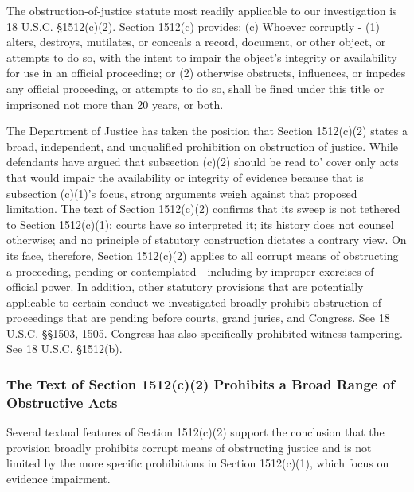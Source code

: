 The obstruction-of-justice statute most readily applicable to our investigation is 18 U.S.C.
\S 1512(c)(2). Section 1512(c) provides:
(c) Whoever corruptly -
(1) alters, destroys, mutilates, or conceals a record, document, or other object, or
attempts to do so, with the intent to impair the object’s integrity or availability for
use in an official proceeding; or
(2) otherwise obstructs, influences, or impedes any official proceeding, or attempts
to do so,
shall be fined under this title or imprisoned not more than 20 years, or both.

The Department of Justice has taken the position that Section 1512(c)(2) states a broad, independent, and unqualified prohibition on obstruction of justice.%
While defendants have argued that subsection (c)(2) should be read to’ cover only acts that would impair the availability or integrity of evidence because that is subsection (c)(1)’s focus, strong arguments weigh against that proposed limitation.
The text of Section 1512(c)(2) confirms that its sweep is not tethered to Section 1512(c)(1); courts have so interpreted it; its history does not counsel otherwise; and no principle of statutory construction dictates a contrary view.
On its face, therefore, Section 1512(c)(2) applies to all corrupt means of obstructing a proceeding, pending or contemplated - including by improper exercises of official power.
In addition, other statutory provisions that are potentially applicable to certain conduct we investigated broadly prohibit obstruction of proceedings that are pending before courts, grand juries, and Congress.
See 18 U.S.C. \S\S 1503, 1505.
Congress has also specifically prohibited witness tampering.
See 18 U.S.C. \S 1512(b).

\subsubsection{The Text of Section 1512(c)(2) Prohibits a Broad Range of Obstructive Acts}

Several textual features of Section 1512(c)(2) support the conclusion that the provision broadly prohibits corrupt means of obstructing justice and is not limited by the more specific prohibitions in Section 1512(c)(1), which focus on evidence impairment.

